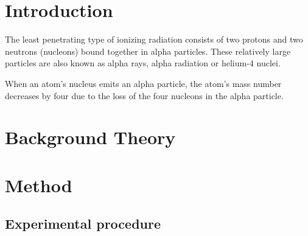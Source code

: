 \documentclass[9pt, a4paper]{article}
\title{
    
}
\author{Ana C. Fabela Hinojosa
\small{School of Physics and Astronomy, Monash University}}
\date{Submitted: \today}
\begin{document}
\maketitle

\begin{abstract}

\end{abstract}

\section{Introduction}
\begin{multicols}{2}
The least penetrating type of ionizing radiation consists of two protons and two neutrons (nucleons) bound together in alpha particles. These relatively large particles are also known as alpha rays, alpha radiation or helium-4 nuclei\cite{alpha}.

When an atom's nucleus emits an alpha particle, the atom's mass number decreases by four due to the loss of the four nucleons in the alpha particle\cite{alpha}. 




\section{Background Theory}


\subsection{}


\section{Method}
 

\subsection{}


\subsection{Experimental procedure}

\subsection{}


\section{}


\end{multicols}
\end{document}
